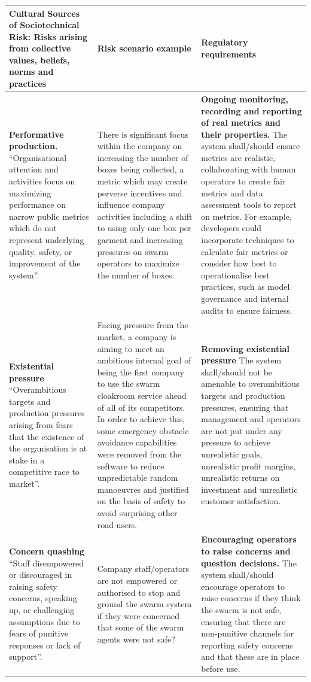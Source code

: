 \documentclass[lettersize,journal]{IEEEtran}
\begin{document}
\begin{landscape}
\begin{table}[]
    \centering
    \begin{tabular}{|p{0.3\textheight}|p{0.3\textheight}|p{0.4\textheight}|}
        \hline
        \textbf{Cultural Sources of Sociotechnical Risk:} Risks arising from collective values, beliefs, norms and practices & \textbf{Risk scenario example} & 	\textbf{Regulatory requirements}\\
        \hline
        \textbf{Performative production.} ``Organisational attention and activities focus on maximizing performance on narrow public metrics which do not represent underlying quality, safety, or improvement of the system”. \cite{macrae2021learning} & There is significant focus within the company on increasing the number of boxes being collected, a metric which may create perverse incentives and influence company activities including a shift to using only one box per garment and increasing pressures on swarm operators to maximize the number of boxes. & \textbf{Ongoing monitoring, recording and reporting of real metrics and their properties.} The system shall/should ensure metrics are realistic, collaborating with human operators to create fair metrics and data assessment tools to report on metrics. For example, developers could incorporate techniques to calculate fair metrics or consider how best to operationalise best practices, such as model governance and internal audits to ensure fairness.\\
        \hline
        \textbf{Existential pressure} ``Overambitious targets and production pressures arising from fears that the existence of the organisation is at stake in a competitive race to market”. \cite{macrae2021learning} & Facing pressure from the market, a company is aiming to meet an ambitious internal goal of being the first company to use the swarm cloakroom service ahead of all of its competitors. In order to achieve this, some emergency obstacle avoidance capabilities were removed from the software to reduce unpredictable random manoeuvres and justified on the basis of safety to avoid surprising other road users. & \textbf{Removing existential pressure} The system shall/should not be amenable to overambitious targets and production pressures, ensuring that management and operators are not put under any pressure to achieve unrealistic goals, unrealistic profit margins, unrealistic returns on investment and unrealistic customer satisfaction.\\
        \hline
        \textbf{Concern quashing} ``Staff disempowered or discouraged in raising safety concerns, speaking up, or challenging assumptions due to fears of punitive responses or lack of support”. \cite{macrae2021learning} & Company staff/operators are not empowered or authorised to stop and ground the swarm system if they were concerned that some of the swarm agents were not safe? & \textbf{Encouraging operators to raise concerns and question decisions.} The system shall/should encourage operators to raise concerns if they think the swarm is not safe, ensuring that there are non-punitive channels for reporting safety concerns and that these are in place before use.\\

\end{tabular}
\end{table}
\end{landscape}
\end{document}

